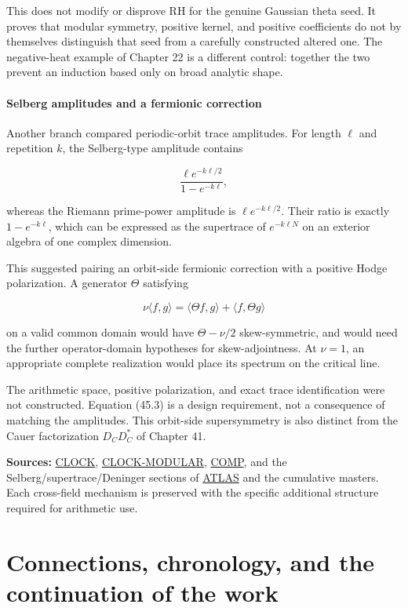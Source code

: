 \documentclass[
  10pt,
  a4paper,
  10pt,
  oneside,
  openany]{book}
\begin{document}
This does not modify or disprove RH for the genuine Gaussian theta seed.
It proves that modular symmetry, positive kernel, and positive
coefficients do not by themselves distinguish that seed from a carefully
constructed altered one. The negative-heat example of Chapter 22 is a
different control: together the two prevent an induction based only on
broad analytic shape.

\subsection{Selberg amplitudes and a fermionic
correction}\label{selberg-amplitudes-and-a-fermionic-correction}

Another branch compared periodic-orbit trace amplitudes. For length
\(\ell\) and repetition \(k\), the Selberg-type amplitude contains

\[
 \frac{\ell e^{-k\ell/2}}{1-e^{-k\ell}},
\]

whereas the Riemann prime-power amplitude is \(\ell e^{-k\ell/2}\).
Their ratio is exactly \(1-e^{-k\ell}\), which can be expressed as the
supertrace of \(e^{-k\ell N}\) on an exterior algebra of one complex
dimension.

This suggested pairing an orbit-side fermionic correction with a
positive Hodge polarization. A generator \(\Theta\) satisfying

\[
 \nu\langle f,g\rangle
 =\langle\Theta f,g\rangle+\langle f,\Theta g\rangle
 \tag{45.3}\label{eq:45.3}
\]

on a valid common domain would have \(\Theta-\nu/2\) skew-symmetric, and
would need the further operator-domain hypotheses for skew-adjointness.
At \(\nu=1\), an appropriate complete realization would place its
spectrum on the critical line.

The arithmetic space, positive polarization, and exact trace
identification were not constructed. Equation (45.3) is a design
requirement, not a consequence of matching the amplitudes. This
orbit-side supersymmetry is also distinct from the Cauer factorization
\(D_CD_C^{*}\) of Chapter 41.

\textbf{Sources:} \hyperref[source-clock]{CLOCK},
\hyperref[source-clock-modular]{CLOCK-MODULAR},
\hyperref[source-comp]{COMP}, and the Selberg/supertrace/Deninger
sections of \hyperref[source-atlas]{ATLAS} and the cumulative masters.
Each cross-field mechanism is preserved with the specific additional
structure required for arithmetic use.

\part{Connections, chronology, and the continuation of the work}
\end{document}
